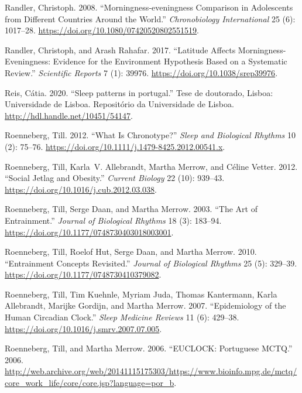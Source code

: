 \documentclass[
  12pt,
  a4paper,
  oneside]{tesesusp}
\newlength{\cslhangindent}
\newlength{\cslentryspacingunit} %
\newenvironment{CSLReferences}[2] %
 {%
  \setlength{\parindent}{0pt}
  \ifodd #1
  \let\oldpar\par
  \def\par{\hangindent=\cslhangindent\oldpar}
  \fi
  \setlength{\parskip}{#2\cslentryspacingunit}
 }%
 {}
\begin{document}
\begin{CSLReferences}{1}{0}
\leavevmode{}%
Randler, Christoph. 2008. {``Morningness‐eveningness Comparison in
Adolescents from Different Countries Around the World.''}
\emph{Chronobiology International} 25 (6): 1017--28.
\url{https://doi.org/10.1080/07420520802551519}.

\leavevmode{}%
Randler, Christoph, and Arash Rahafar. 2017. {``Latitude Affects
Morningness-Eveningness: Evidence for the Environment Hypothesis Based
on a Systematic Review.''} \emph{Scientific Reports} 7 (1): 39976.
\url{https://doi.org/10.1038/srep39976}.

\leavevmode{}%
Reis, Cátia. 2020. {``Sleep patterns in portugal.''} Tese de doutorado,
Lisboa: Universidade de Lisboa. Repositório da Universidade de Lisboa.
\url{http://hdl.handle.net/10451/54147}.

\leavevmode{}%
Roenneberg, Till. 2012. {``What Is Chronotype?''} \emph{Sleep and
Biological Rhythms} 10 (2): 75--76.
\url{https://doi.org/10.1111/j.1479-8425.2012.00541.x}.

\leavevmode{}%
Roenneberg, Till, Karla~V. Allebrandt, Martha Merrow, and Céline Vetter.
2012. {``Social Jetlag and Obesity.''} \emph{Current Biology} 22 (10):
939--43. \url{https://doi.org/10.1016/j.cub.2012.03.038}.

\leavevmode{}%
Roenneberg, Till, Serge Daan, and Martha Merrow. 2003. {``The Art of
Entrainment.''} \emph{Journal of Biological Rhythms} 18 (3): 183--94.
\url{https://doi.org/10.1177/0748730403018003001}.

\leavevmode{}%
Roenneberg, Till, Roelof Hut, Serge Daan, and Martha Merrow. 2010.
{``Entrainment Concepts Revisited.''} \emph{Journal of Biological
Rhythms} 25 (5): 329--39.
\url{https://doi.org/10.1177/0748730410379082}.

\leavevmode{}%
Roenneberg, Till, Tim Kuehnle, Myriam Juda, Thomas Kantermann, Karla
Allebrandt, Marijke Gordijn, and Martha Merrow. 2007. {``Epidemiology of
the Human Circadian Clock.''} \emph{Sleep Medicine Reviews} 11 (6):
429--38. \url{https://doi.org/10.1016/j.smrv.2007.07.005}.

\leavevmode{}%
Roenneberg, Till, and Martha Merrow. 2006. {``EUCLOCK: Portuguese
MCTQ.''} 2006.
\url{http://web.archive.org/web/20141115175303/https://www.bioinfo.mpg.de/mctq/core_work_life/core/core.jsp?language=por_b}.


\end{CSLReferences}
\end{document}
